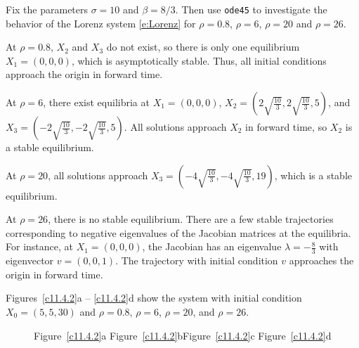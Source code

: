 \documentclass{ximera}
\begin{document}
\begin{exercise} \label{c11.4.2}
Fix the parameters $\sigma=10$ and $\beta = 8/3$.  Then
use {\tt ode45} to investigate the behavior of the Lorenz system
\eqref{e:Lorenz} for $\rho=0.8$, $\rho=6$, $\rho=20$ and $\rho=26$.

\begin{solution}

At $\rho = 0.8$, $X_2$ and $X_3$ do not exist, so there is only one
equilibrium $X_1 = (0,0,0)$, which is asymptotically stable.  Thus, all
initial conditions approach the origin in forward time.

\para At $\rho = 6$, there exist equilibria at $X_1 = (0,0,0)$, $X_2 =
(2\sqrt{\frac{10}{3}}, 2\sqrt{\frac{10}{3}}, 5)$, and
$X_3 = (-2\sqrt{\frac{10}{3}}, -2\sqrt{\frac{10}{3}}, 5)$.  All solutions
approach $X_2$ in forward time, so $X_2$ is a stable equilibrium.

\para At $\rho = 20$, all solutions approach $X_3 = (-4\sqrt{\frac{10}{3}},
-4\sqrt{\frac{10}{3}}, 19)$, which is a stable equilibrium.

\para At $\rho = 26$, there is no stable equilibrium.  There are a few
stable trajectories corresponding to negative eigenvalues of the Jacobian
matrices at the equilibria.  For instance, at $X_1 = (0,0,0)$, the Jacobian
has an eigenvalue $\lambda = -\frac{8}{3}$ with eigenvector $v = (0,0,1)$.
The trajectory with initial condition $v$ approaches the origin in forward
time.

\para Figures~\ref{c11.4.2}a -- \ref{c11.4.2}d show the system with
initial condition $X_0 = (5,5,30)$ and $\rho = 0.8$, $\rho = 6$, $\rho = 20$,
and $\rho = 26$.

\begin{figure}[htb]
                       \centerline{%
                       }
		\centerline{Figure~\ref{c11.4.2}a\hspace{0.8in}
        	Figure~\ref{c11.4.2}b\hspace{0.8in}Figure~\ref{c11.4.2}c
        	\hspace{0.8in}Figure~\ref{c11.4.2}d}
\end{figure}


\end{solution}
\end{exercise}
\end{document}
